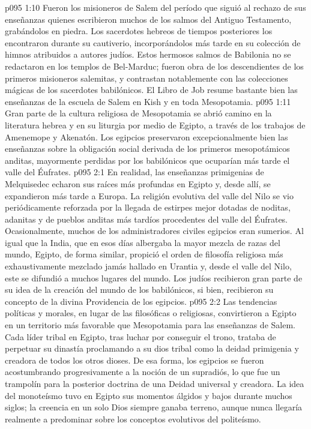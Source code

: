 \vs p095 1:10 \pc Fueron los misioneros de Salem del período que siguió al rechazo de sus enseñanzas quienes escribieron muchos de los salmos del Antiguo Testamento, grabándolos en piedra. Los sacerdotes hebreos de tiempos posteriores los encontraron durante su cautiverio, incorporándolos más tarde en su colección de himnos atribuidos a autores judíos. Estos hermosos salmos de Babilonia no se redactaron en los templos de Bel\hyp{}Marduc; fueron obra de los descendientes de los primeros misioneros salemitas, y contrastan notablemente con las colecciones mágicas de los sacerdotes babilónicos. El Libro de Job resume bastante bien las enseñanzas de la escuela de Salem en Kish y en toda Mesopotamia.
\vs p095 1:11 Gran parte de la cultura religiosa de Mesopotamia se abrió camino en la literatura hebrea y en su liturgia por medio de Egipto, a través de los trabajos de Amenemope y Akenatón. Los egipcios preservaron excepcionalmente bien las enseñanzas sobre la obligación social derivada de los primeros mesopotámicos anditas, mayormente perdidas por los babilónicos que ocuparían más tarde el valle del Éufrates.
\vs p095 2:1 En realidad, las enseñanzas primigenias de Melquisedec echaron sus raíces más profundas en Egipto y, desde allí, se expandieron más tarde a Europa. La religión evolutiva del valle del Nilo se vio periódicamente reforzada por la llegada de estirpes mejor dotadas de noditas, adanitas y de pueblos anditas más tardíos procedentes del valle del Éufrates. Ocasionalmente, muchos de los administradores civiles egipcios eran sumerios. Al igual que la India, que en esos días albergaba la mayor mezcla de razas del mundo, Egipto, de forma similar, propició el orden de filosofía religiosa más exhaustivamente mezclado jamás hallado en Urantia y, desde el valle del Nilo, este se difundió a muchos lugares del mundo. Los judíos recibieron gran parte de su idea de la creación del mundo de los babilónicos, si bien, recibieron su concepto de la divina Providencia de los egipcios.
\vs p095 2:2 Las tendencias políticas y morales, en lugar de las filosóficas o religiosas, convirtieron a Egipto en un territorio más favorable que Mesopotamia para las enseñanzas de Salem. Cada líder tribal en Egipto, tras luchar por conseguir el trono, trataba de perpetuar su dinastía proclamando a su dios tribal como la deidad primigenia y creadora de todos los otros dioses. De esa forma, los egipcios se fueron acostumbrando progresivamente a la noción de un supradiós, lo que fue un trampolín para la posterior doctrina de una Deidad universal y creadora. La idea del monoteísmo tuvo en Egipto sus momentos álgidos y bajos durante muchos siglos; la creencia en un solo Dios siempre ganaba terreno, aunque nunca llegaría realmente a predominar sobre los conceptos evolutivos del politeísmo.
